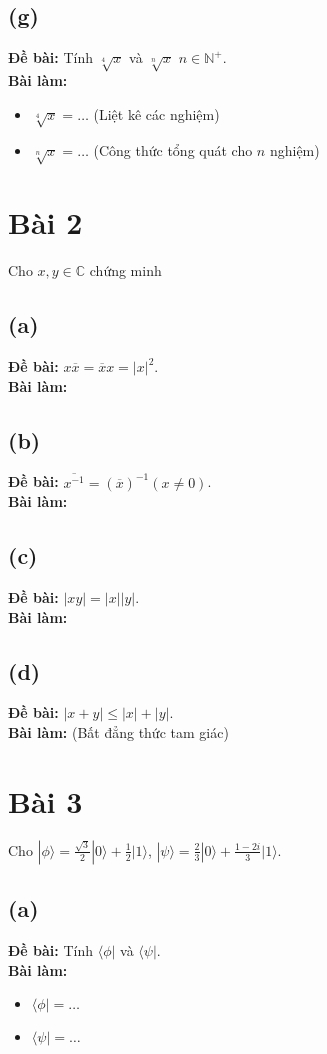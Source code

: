 \subsection{(g)}
\textbf{Đề bài:} Tính $\sqrt[4]{x}$ và $\sqrt[n]{x}$ $n\in\mathbb{N}^{+}$.\\
\textbf{Bài làm:}
\begin{itemize}
    \item $\sqrt[4]{x} = \dots$ (Liệt kê các nghiệm)
    \item $\sqrt[n]{x} = \dots$ (Công thức tổng quát cho $n$ nghiệm)
\end{itemize}

\section{Bài 2}
Cho $x, y\in\mathbb{C}$ chứng minh

\subsection{(a)}
\textbf{Đề bài:} $x\overline{x}=\overline{x}x=|x|^{2}$.\\
\textbf{Bài làm:}

\subsection{(b)}
\textbf{Đề bài:} $\overline{x^{-1}}=(\overline{x})^{-1}(x\ne0)$.\\
\textbf{Bài làm:}

\subsection{(c)}
\textbf{Đề bài:} $|xy|=|x||y|$.\\
\textbf{Bài làm:}

\subsection{(d)}
\textbf{Đề bài:} $|x+y|\le|x|+|y|$.\\
\textbf{Bài làm:} (Bất đẳng thức tam giác)

\section{Bài 3}
Cho $|\phi\rangle=\frac{\sqrt{3}}{2}|0\rangle+\frac{1}{2}|1\rangle$, $|\psi\rangle=\frac{2}{3}|0\rangle+\frac{1-2i}{3}|1\rangle$.

\subsection{(a)}
\textbf{Đề bài:} Tính $\langle\phi|$ và $\langle\psi|$.\\
\textbf{Bài làm:}
\begin{itemize}
    \item $\langle\phi| = \dots$
    \item $\langle\psi| = \dots$
\end{itemize}

